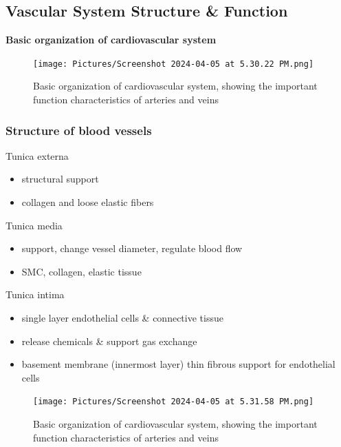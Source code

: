 \documentclass[11pt,fleqn]{book} %
\begin{document}
\subsection{Vascular System Structure \& Function}
\textbf{Basic organization of cardiovascular system}
\begin{figure}[h!]
\begin{center}
    \texttt{[image: Pictures/Screenshot 2024-04-05 at 5.30.22 PM.png]}
\end{center}
    \caption{Basic organization of cardiovascular system, showing the important function characteristics of arteries and veins}
\end{figure}
\subsubsection{Structure of blood vessels}
\begin{descriptions}
    \item[Tunica externa]\begin{descriptions}
    \end{descriptions} 
    \begin{itemize}
        \item structural support
        \item collagen and loose elastic fibers
    \end{itemize}
    \item[Tunica media]\begin{descriptions}
    \end{descriptions} 
    \begin{itemize}
        \item support, change vessel diameter, regulate blood flow
        \item SMC, collagen, elastic tissue
    \end{itemize}
    \item[Tunica intima]\begin{descriptions}
    \end{descriptions} 
    \begin{itemize}
        \item single layer endothelial cells \& connective tissue
        \item release chemicals \& support gas exchange
        \item basement membrane (innermost layer) thin fibrous support for endothelial cells
    \end{itemize}
\end{descriptions}
\begin{figure}[h!]
\begin{center}
    \texttt{[image: Pictures/Screenshot 2024-04-05 at 5.31.58 PM.png]}
\end{center}
    \caption{Basic organization of cardiovascular system, showing the important function characteristics of arteries and veins}
\end{figure}
\end{document}
